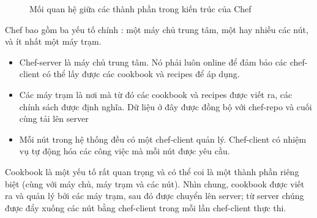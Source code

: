 \begin{figure}[h!]
    \begin{center}
    \end{center}
    \caption{Mối quan hệ giữa các thành phần trong kiến trúc của Chef}
    \label{fig:chef_overview}
\end{figure}

Chef bao gồm ba yếu tố chính : một máy chủ trung tâm, một hay nhiều các nút, và ít nhất một máy trạm.

\begin{itemize}
\item Chef-server là máy chủ trung tâm. Nó phải luôn online để đảm bảo các chef-client có thể lấy được các cookbook và recipes để áp dụng.
\item Các máy trạm là nơi mà từ đó các cookbook và recipes được viết ra, các chính sách được định nghĩa. Dữ liệu ở đây được đồng bộ với chef-repo và cuối cùng tải lên server
\item Mỗi nút trong hệ thống đều có một chef-client quản lý. Chef-client có nhiệm vụ tự động hóa các công việc mà mỗi nút được yêu cầu.
\end{itemize}

Cookbook là một yếu tố rất quan trọng và có thể coi là một thành phần riêng biệt (cùng với máy chủ, máy trạm và các nút). Nhìn chung, cookbook được viết ra và quản lý bởi các máy trạm, sau đó được chuyển lên server; từ server chúng được đẩy xuống các nút bằng chef-client trong mỗi lần chef-client thực thi.

